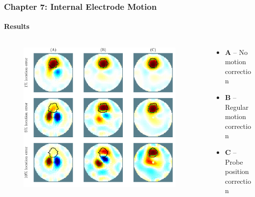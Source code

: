 \documentclass[10pt,    %
    english,            %
    xcolor=table,       %
    envcountsect,        %
    aspectratio=1610
]{beamer}
\begin{document}
\begin{frame}
	\frametitle{Chapter 7: Internal Electrode Motion}
	\framesubtitle{Results}
	\begin{columns}[c]
		\begin{column}{0.65\textwidth}
			\begin{figure}[H]
				\centering
				\includegraphics[width=0.95\textwidth,trim={0cm 0.6cm 0 0cm},clip]{recon_accuracy_hollow_loc_10.pdf}
			\end{figure}
		\end{column}
		\begin{column}{0.35\textwidth}
			\begin{itemize}
				\item \alert{\textbf{A}} -- No motion correction
				\vspace{4mm}
				\item \alert{\textbf{B}} -- Regular motion correction
				\vspace{4mm}
				\item \alert{\textbf{C}} -- Probe position correction
			\end{itemize}
		\end{column}
	\end{columns}
\end{frame}
\end{document}
